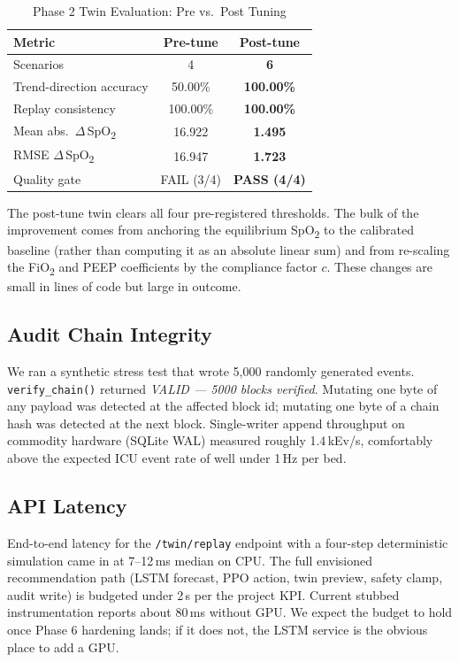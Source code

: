 \documentclass[conference]{IEEEtran}
\begin{document}
\begin{table}[h]
\centering
\caption{Phase 2 Twin Evaluation: Pre vs.\ Post Tuning}
\label{tab:twin_results}
\renewcommand{\arraystretch}{1.15}
\begin{tabular}{lcc}
\toprule
\textbf{Metric}                  & \textbf{Pre-tune}     & \textbf{Post-tune}\\
\midrule
Scenarios                        & 4                     & \textbf{6}\\
Trend-direction accuracy         & 50.00\%               & \textbf{100.00\%}\\
Replay consistency               & 100.00\%              & \textbf{100.00\%}\\
Mean abs.\ $\Delta$\,SpO\textsubscript{2} & 16.922       & \textbf{1.495}\\
RMSE $\Delta$\,SpO\textsubscript{2} & 16.947             & \textbf{1.723}\\
Quality gate                     & FAIL (3/4)            & \textbf{PASS (4/4)}\\
\bottomrule
\end{tabular}
\end{table}

The post-tune twin clears all four pre-registered thresholds. The bulk of the improvement comes from anchoring the equilibrium SpO\textsubscript{2} to the calibrated baseline (rather than computing it as an absolute linear sum) and from re-scaling the FiO\textsubscript{2} and PEEP coefficients by the compliance factor $c$. These changes are small in lines of code but large in outcome.

\subsection{Audit Chain Integrity}
We ran a synthetic stress test that wrote 5{,}000 randomly generated events. \texttt{verify\_chain()} returned \emph{VALID --- 5000 blocks verified}. Mutating one byte of any payload was detected at the affected block id; mutating one byte of a chain hash was detected at the next block. Single-writer append throughput on commodity hardware (SQLite WAL) measured roughly 1.4\,kEv/s, comfortably above the expected ICU event rate of well under 1\,Hz per bed.

\subsection{API Latency}
End-to-end latency for the \texttt{/twin/replay} endpoint with a four-step deterministic simulation came in at 7--12\,ms median on CPU. The full envisioned recommendation path (LSTM forecast, PPO action, twin preview, safety clamp, audit write) is budgeted under 2\,s per the project KPI. Current stubbed instrumentation reports about 80\,ms without GPU. We expect the budget to hold once Phase 6 hardening lands; if it does not, the LSTM service is the obvious place to add a GPU.
\end{document}
